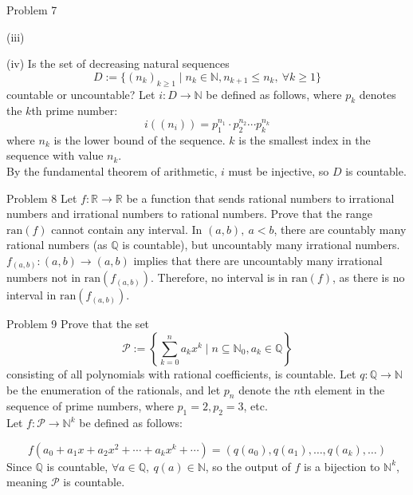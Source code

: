 \documentclass[10pt]{extarticle}
\begin{document}
\begin{problem}{Problem 7}
\begin{problem}{(iii)}
    \end{problem}
    \begin{problem}{(iv)}
      Is the set of decreasing natural sequences $$D:= \{(n_k)_{k\geq 1}\mid n_k\in \mathbb{N}, n_{k+1}\leq n_k,~\forall k\geq 1\}$$ countable or uncountable?
      \tcblower
      Let $i: D\rightarrow \mathbb{N}$ be defined as follows, where $p_k$ denotes the $k$th prime number:
      \[
        i((n_i)) = p_1^{n_1}\cdot p_2^{n_2} \cdots p_k^{n_k}
      \] 
      where $n_k$ is the lower bound of the sequence. $k$ is the smallest index in the sequence with value $n_k$.\\

      By the fundamental theorem of arithmetic, $i$ must be injective, so $D$ is countable.
    \end{problem}
  \end{problem}
  \begin{problem}{Problem 8}
    Let $f:\mathbb{R} \rightarrow \mathbb{R}$ be a function that sends rational numbers to irrational numbers and irrational numbers to rational numbers. Prove that the range $\textrm{ran}(f)$ cannot contain any interval.
    \tcblower
    In $(a,b),~a<b$, there are countably many rational numbers (as $\mathbb{Q}$ is countable), but uncountably many irrational numbers.\\

    $f_{(a,b)}: (a,b) \rightarrow (a,b)$ implies that there are uncountably many irrational numbers not in $\textrm{ran}(f_{(a,b)})$. Therefore, no interval is in $\textrm{ran}(f)$, as there is no interval in $\textrm{ran}(f_{(a,b)})$.
  \end{problem}
  \begin{problem}{Problem 9}
    Prove that the set
    \[
      \mathcal{P} := \left\{\sum_{k=0}^{n}a_kx^k \mid n\subseteq \mathbb{N}_0,a_k\in\mathbb{Q}\right\}
    \] 
    consisting of all polynomials with rational coefficients, is countable.
    \tcblower
    Let $q: \mathbb{Q} \rightarrow \mathbb{N}$ be the enumeration of the rationals, and let $p_n$ denote the $n$th element in the sequence of prime numbers, where $p_1 = 2, p_2 = 3$, etc.\\

    Let $f: \mathcal{P} \rightarrow \mathbb{N}^k$ be defined as follows:

    \[
      f(a_0 + a_1x + a_2x^2 + \cdots + a_kx^k + \cdots) = (q(a_0),q(a_1),\dots,q(a_k),\dots)
    \] 
    Since $\mathbb{Q}$ is countable, $\forall a\in \mathbb{Q},~q(a)\in \mathbb{N}$, so the output of $f$ is a bijection to $\mathbb{N}^k$, meaning $\mathcal{P}$ is countable.
  \end{problem}
\end{document}
